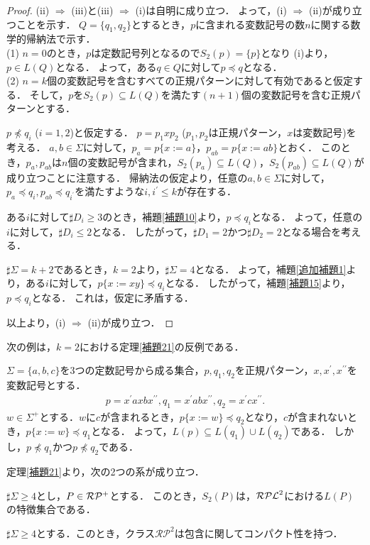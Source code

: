 \begin{proof}
(ii) $\Rightarrow$ (iii)と(iii) $\Rightarrow$ (i)は自明に成り立つ．
よって，(i) $\Rightarrow$ (ii)が成り立つことを示す．
$Q= \{ q_{1}, q_{2} \}$とするとき，$p$に含まれる変数記号の数$n$に関する数学的帰納法で示す．\\
\noindent (1) $n=0$のとき，$p$は定数記号列となるので$S_{2}(p)= \{ p \}$となり
(i)より，$p \in L(Q)$となる．
よって，ある$q \in Q$に対して$p \preceq q$となる．\\
\noindent (2) $n=k$個の変数記号を含むすべての正規パターンに対して有効であると仮定する．
そして，$p$を$S_{2}(p) \subseteq L(Q)$を満たす$(n+1)$個の変数記号を含む正規パターンとする．

$p \not \preceq q_{i}$ ($i=1, 2$)と仮定する．
$p=p_{1}xp_{2}$ ($p_{1}, p_{2}$は正規パターン，$x$は変数記号)を考える．
$a, b \in \Sigma$に対して，$p_{a}=p \{ x := a \}$，$p_{ab}=p \{ x := ab \}$とおく．
このとき，$p_{a},p_{ab}$は$n$個の変数記号が含まれ，$S_{2}(p_{a}) \subseteq L(Q)$，$S_{2}(p_{ab}) \subseteq L(Q)$が成り立つことに注意する．
帰納法の仮定より，任意の$a, b \in \Sigma$に対して，$p_{a} \preceq q_{i}, p_{ab} \preceq q_{i^{\prime}}$を満たすような$i, i^{\prime} \le k$が存在する．

ある$i$に対して$\sharp D_{i} \ge 3$のとき，補題\ref{補題10}より，$p \preceq q_{i}$となる．
よって，任意の$i$に対して，$\sharp D_{i} \le 2$となる．
したがって，$\sharp D_{1}=2$かつ$\sharp D_{2}=2$となる場合を考える．

$\sharp \Sigma = k+2$であるとき，$k=2$より，$\sharp \Sigma =4$となる．
よって，補題\ref{追加補題1}より，ある$i$に対して，$p \{ x:=xy \} \preceq q_{i}$となる．
したがって，補題\ref{補題15}より，$p \preceq q_{i}$となる．
これは，仮定に矛盾する．

以上より，(i) $\Rightarrow$ (ii)が成り立つ．
\end{proof}

次の例は，$k = 2$における定理\ref{補題21}の反例である．
\begin{ex}\label{反例thm17}
$\Sigma= \{a, b, c \}$を$3$つの定数記号から成る集合，$p,q_{1},q_{2}$を正規パターン，$x,x^{\prime},x^{\prime\prime}$を変数記号とする．
\begin{eqnarray*}
p = x^{\prime}axbx^{\prime\prime},
q_{1} = x^{\prime}abx^{\prime\prime},
q_{2} = x^{\prime}cx^{\prime\prime}.
\end{eqnarray*}
$w \in \Sigma^{+}$とする．$w$に$c$が含まれるとき，$p \{ x:=w \} \preceq q_{2}$となり，$c$が含まれないとき，$p \{ x:=w \} \preceq q_{1}$となる．
よって，$L(p) \subseteq L(q_{1}) \cup L(q_{2})$である．
しかし，$p \not \preceq q_{1}$かつ$p \not \preceq q_{2}$である．
\end{ex}

定理\ref{補題21}より，次の2つの系が成り立つ．
\begin{col}
$\sharp\Sigma \ge 4$とし，$P \in \mathcal{RP^{+}}$とする．
このとき，$S_{2}(P)$は，$\mathcal{RPL}^{2}$における$L(P)$の特徴集合である．
\end{col}

\begin{col}
$\sharp\Sigma \ge 4$とする．このとき，クラス$\mathcal{RP}^{2}$は包含に関してコンパクト性を持つ．
\end{col}
